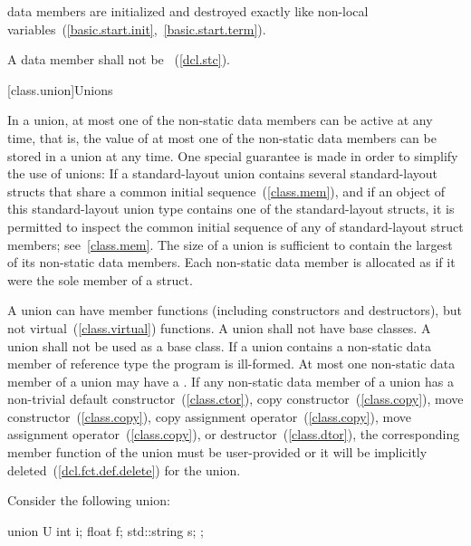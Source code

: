 \pnum
{} data members are initialized and destroyed exactly like
non-local variables~(\ref{basic.start.init},~\ref{basic.start.term}).

\pnum
A  data member shall not be
~(\ref{dcl.stc}).

[class.union]{Unions}%

\pnum
In a union, at most one of the non-static data members can be active at any
time, that is, the value of at most one of the non-static data members can be
stored in a union at any time. \enternote One special guarantee is made in order to
simplify the use of unions: If a standard-layout union contains several standard-layout
structs that share a common initial sequence~(\ref{class.mem}), and if an object of this
standard-layout union type contains one of the standard-layout structs, it is permitted
to inspect the common initial sequence of any of standard-layout struct members;
see~\ref{class.mem}. \exitnote The size of a union is sufficient to contain the largest
of its non-static data members. Each non-static data member is allocated
as if it were the sole member of a struct.

\pnum
{}%
%
%
A union can have member functions (including constructors and destructors),
%
but not virtual~(\ref{class.virtual}) functions. A union shall not have
base classes. A union shall not be used as a base class.
%
If a union contains a non-static data member of
reference type the program is ill-formed.
At most one non-static data member of a union may have a
.
\enternote If any non-static data member of a union has a non-trivial
default constructor~(\ref{class.ctor}),
copy constructor~(\ref{class.copy}),
move constructor~(\ref{class.copy}),
copy assignment operator~(\ref{class.copy}),
move assignment operator~(\ref{class.copy}),
or destructor~(\ref{class.dtor}), the corresponding member function
of the union must be user-provided or it will
be implicitly deleted~(\ref{dcl.fct.def.delete}) for the union. \exitnote

\pnum
\enterexample Consider the following union:

\begin{codeblock}
union U {
  int i;
  float f;
  std::string s;
};
\end{codeblock}

